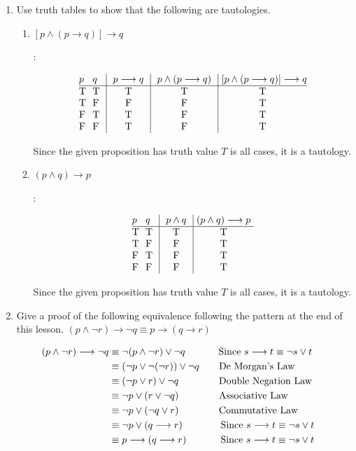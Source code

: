 \documentclass[11pt]{amsart}
\begin{document}
\begin{enumerate}
\item Use truth tables to show that  the following are  tautologies.

\begin{enumerate}

\item $[p\wedge (p\longrightarrow q)]\longrightarrow q$

:

$$\vbox{\offinterlineskip
\halign { \strut # & # & \vrule ~~# & \vrule ~~# & \vrule ~#\cr
$p$ & $q$ & $p\longrightarrow q$ & $p\wedge(p\longrightarrow q)$ &  $[p\wedge (p\longrightarrow q)]\longrightarrow q$\cr
\noalign{\hrule}
T   &  T   &  T  &  T & T \cr
T   &  F   &  F  &  F & T \cr
F   &  T   &  T  &  F & T \cr
F   &  F   &  T  &  F & T \cr
}}$$

Since the given proposition has truth value $T$ is all cases, it is a tautology.


\item $(p\wedge q)\longrightarrow p$

:

$$\vbox{\offinterlineskip
\halign { \strut # & # & \vrule ~~# & \vrule ~#\cr
$p$ & $q$ & $p\wedge q$ & $(p\wedge q)\longrightarrow p$ \cr
\noalign{\hrule}
T   &  T   &  T  &  T \cr
T   &  F   &  F  &  T \cr
F   &  T   &  F  &  T \cr
F   &  F   &  F  &  T \cr
}}$$

Since the given proposition has truth value $T$ is all cases, it is a tautology.

\end{enumerate}

\medskip

\item Give a proof of the following equivalence following the pattern
at the end of this lesson.
 $(p\land\neg r)\longrightarrow\neg q \equiv p\longrightarrow(q\longrightarrow r)$

\begin{align*}
 (p\land\neg r)\longrightarrow \neg q
&\equiv \neg (p \land \neg r) \lor \neg q \hskip 34pt\text {Since $s\longrightarrow t\equiv \neg s \lor t$}\cr
&\equiv (\neg p \lor\neg(\neg r))\lor\neg q \hskip 20pt\text {De Morgan's Law}\cr
&\equiv (\neg p \lor r) \lor \neg q\hskip 41pt\text{Double Negation Law}\cr
&\equiv \neg p\lor (r \lor \neg q) \hskip 41pt\text{Associative Law}\cr
&\equiv \neg p\lor (\neg q \lor r) \hskip 41pt\text{Commutative Law}\cr
&\equiv  \neg p \lor (q \longrightarrow r) \hskip 39pt\text{Since $s\longrightarrow t\equiv \neg s \lor t$ }\cr
&\equiv  p \longrightarrow (q\longrightarrow r)\hskip 35pt\text{Since $s\longrightarrow t\equiv \neg s \lor t$}\cr
\end{align*}

\end{enumerate}
\end{document}
